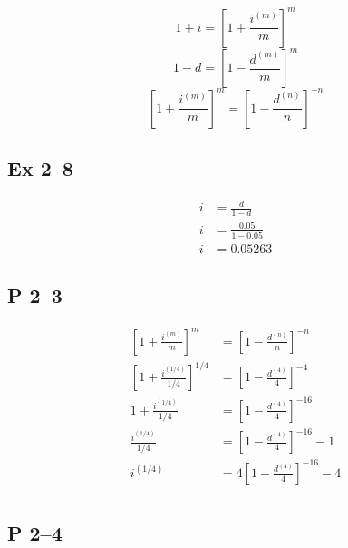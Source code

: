 \documentclass[a4paper, 12pt, reqno]{amsart}
\numberwithin{equation}{section}
\begin{document}
\begin{equation}\nonumber
    1+i = \left[ 1 + \frac{i^{(m)}}{m} \right]^m
\end{equation}
\begin{equation}\nonumber
    1-d = \left[ 1 - \frac{d^{(m)}}{m} \right]^m
\end{equation}
\begin{equation}\nonumber
    \left[ 1 + \frac{i^{(m)}}{m} \right]^m = 
        \left[ 1 - \frac{d^{(n)}}{n} \right]^{-n}
\end{equation}

\subsection*{Ex 2--8}

\begin{equation}\nonumber
    \begin{aligned}
        i &= \frac{d}{1-d}      \\
        i &= \frac{0.05}{1-0.05}      \\
        i &= 0.05263
    \end{aligned}
\end{equation}

\subsection*{P 2--3}

\begin{equation}\nonumber
    \begin{aligned}
        \left[ 1 + \frac{i^{(m)}}{m} \right]^m &= 
            \left[ 1 - \frac{d^{(n)}}{n} \right]^{-n}   \\
        \left[ 1 + \frac{i^{(1/4)}}{1/4} \right]^{1/4} &= 
            \left[ 1 - \frac{d^{(4)}}{4} \right]^{-4}   \\
        1 + \frac{i^{(1/4)}}{1/4} &= 
            \left[ 1 - \frac{d^{(4)}}{4} \right]^{-16}   \\
        \frac{i^{(1/4)}}{1/4} &= \left[1-\frac{d^{(4)}}{4} \right]^{-16} - 1 \\
        i^{(1/4)} &=4 \left[1-\frac{d^{(4)}}{4} \right]^{-16} - 4 \\
    \end{aligned}
\end{equation}

\subsection*{P 2--4}
\end{document}
